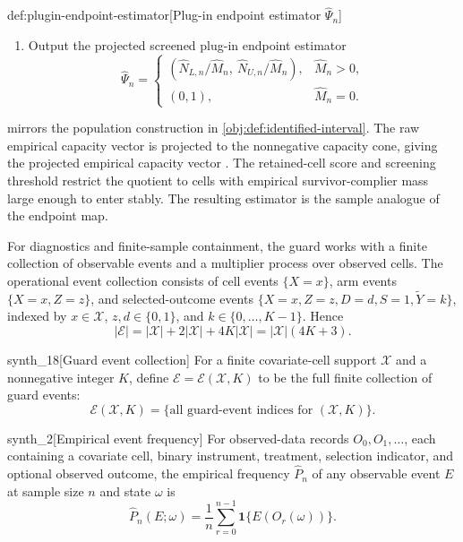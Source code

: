 \documentclass[11pt]{article}
\begin{document}
\begin{algorithmv}{def:plugin-endpoint-estimator}[Plug-in endpoint estimator \(\widehat\Psi_n\)]
\begin{enumerate}
\item Output the projected screened plug-in endpoint estimator
\[
\widehat\Psi_n=
\begin{cases}
\left(\widehat N_{L,n}/\widehat M_n,\ \widehat N_{U,n}/\widehat M_n\right),
& \widehat M_n>0,\\
(0,1), & \widehat M_n=0.
\end{cases}
\]
\end{enumerate}
\end{algorithmv}

 mirrors the population construction in \cref{obj:def:identified-interval}.  The raw empirical capacity vector  is projected to the nonnegative capacity cone, giving the projected empirical capacity vector .  The retained-cell score  and screening threshold  restrict the quotient to cells with empirical survivor-complier mass large enough to enter stably.  The resulting estimator  is the sample analogue of the endpoint map.

For diagnostics and finite-sample containment, the guard works with a finite collection of observable events and a multiplier process over observed cells.  The operational event collection consists of cell events \(\{X=x\}\), arm events \(\{X=x,Z=z\}\), and selected-outcome events \(\{X=x,Z=z,D=d,S=1,\widetilde Y=k\}\), indexed by \(x\in\mathcal X\), \(z,d\in\{0,1\}\), and \(k\in\{0,\ldots,K-1\}\).  Hence
\[
|\mathcal E|=|\mathcal X|+2|\mathcal X|+4K|\mathcal X|
=|\mathcal X|(4K+3).
\]

\begin{definitionv}{synth_18}[Guard event collection]
For a finite covariate-cell support \(\mathcal X\) and a nonnegative integer \(K\), define \(\mathcal E=\mathcal E(\mathcal X,K)\) to be the full finite collection of guard events:
\[
\mathcal E(\mathcal X,K)=\{\text{all guard-event indices for }(\mathcal X,K)\}.
\]
\end{definitionv}

\begin{definitionv}{synth_2}[Empirical event frequency]
For observed-data records \(O_0,O_1,\ldots\), each containing a covariate cell, binary instrument, treatment, selection indicator, and optional observed outcome, the empirical frequency \(\widehat P_n\) of any observable event \(E\) at sample size \(n\) and state \(\omega\) is
\[
\widehat P_n(E;\omega)
=
\frac{1}{n}\sum_{r=0}^{n-1}\mathbf 1\{E(O_r(\omega))\}.
\]
\end{definitionv}
\end{document}
